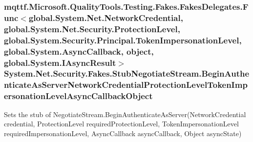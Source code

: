 \hypertarget{class_system_1_1_net_1_1_security_1_1_fakes_1_1_stub_negotiate_stream_a2edb1fae407f3300254e1681659af588}{
\subsubsection[{Begin\-Authenticate\-As\-Server\-Network\-Credential\-Protection\-Level\-Token\-Impersonation\-Level\-Async\-Callback\-Object}]{\setlength{\rightskip}{0pt plus 5cm}mqttf.\-Microsoft.\-Quality\-Tools.\-Testing.\-Fakes.\-Fakes\-Delegates.\-Func$<$global.\-System.\-Net.\-Network\-Credential, global.\-System.\-Net.\-Security.\-Protection\-Level, global.\-System.\-Security.\-Principal.\-Token\-Impersonation\-Level, global.\-System.\-Async\-Callback, object, global.\-System.\-I\-Async\-Result$>$ System.\-Net.\-Security.\-Fakes.\-Stub\-Negotiate\-Stream.\-Begin\-Authenticate\-As\-Server\-Network\-Credential\-Protection\-Level\-Token\-Impersonation\-Level\-Async\-Callback\-Object}}\label{class_system_1_1_net_1_1_security_1_1_fakes_1_1_stub_negotiate_stream_a2edb1fae407f3300254e1681659af588}


Sets the stub of Negotiate\-Stream.\-Begin\-Authenticate\-As\-Server(\-Network\-Credential credential, Protection\-Level required\-Protection\-Level, Token\-Impersonation\-Level required\-Impersonation\-Level, Async\-Callback async\-Callback, Object async\-State)


